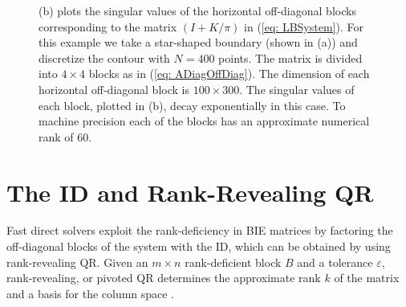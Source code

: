\documentclass{sfuthesis}
\begin{document}
\begin{figure}
\begin{subfigure}[b]{0.5\textwidth}
                \caption{}
                 \label{OffDiagSingValues}
        \end{subfigure}
        \caption{(b) plots the singular values of the horizontal off-diagonal blocks corresponding to the matrix $(I+K/ \pi)$ in (\ref{eq: LBSystem}). For this example we take a star-shaped boundary (shown in (a)) and discretize the contour with $N=400$ points. The matrix is divided into $4 \times 4$ blocks as in (\ref{eq: ADiagOffDiag}). The dimension of each horizontal off-diagonal block is $100 \times 300$. The singular values of each block, plotted in (b), decay exponentially in this case. To machine precision each of the blocks has an approximate numerical rank of 60. }
        \label{fig: offdrank}
\end{figure}

\section{The ID and Rank-Revealing QR}
\label{sec: ID}

Fast direct solvers exploit the rank-deficiency in BIE matrices by factoring the off-diagonal blocks of the system with the ID, which can be obtained by using rank-revealing QR. Given an $m\times n$ rank-deficient block $B$ and a tolerance $\varepsilon$, rank-revealing, or pivoted QR determines the approximate rank $k$ of the matrix and a basis for the column space \cite{Tref97, Bjorck96, Dax2000}. 
\end{document}
